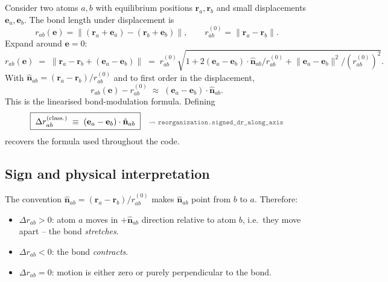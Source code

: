 \documentclass[10pt,a4paper,twoside]{article}
\newcommand{\rvec}{\mathbf{r}}
\newcommand{\evec}{\mathbf{e}}
\newcommand{\nhat}{\hat{\mathbf{n}}}
\newcommand{\codref}[1]{%
  \quad\text{\textcolor{gray!70!black}{\footnotesize $\rightsquigarrow$~\texttt{#1}}}}
\begin{document}
Consider two atoms $a, b$ with equilibrium positions $\rvec_a, \rvec_b$
and small displacements $\evec_a, \evec_b$. The bond length under
displacement is
\begin{equation}
  r_{ab}(\evec) = \lVert (\rvec_a + \evec_a) - (\rvec_b + \evec_b)\rVert,
  \qquad
  r_{ab}^{(0)} = \lVert\rvec_a - \rvec_b\rVert.
\end{equation}
Expand around $\evec = 0$:
\begin{equation}
  r_{ab}(\evec)
    \;=\;
  \lVert \rvec_a - \rvec_b + (\evec_a - \evec_b)\rVert
    \;=\;
  r_{ab}^{(0)}\sqrt{1 + 2(\evec_a - \evec_b)\cdot\nhat_{ab}/r_{ab}^{(0)}
       + \lVert\evec_a - \evec_b\rVert^2/(r_{ab}^{(0)})^2}.
\end{equation}
With $\nhat_{ab} = (\rvec_a - \rvec_b)/r_{ab}^{(0)}$ and to first
order in the displacement,
\begin{equation}
  r_{ab}(\evec) - r_{ab}^{(0)}
    \;\approx\;
  (\evec_a - \evec_b) \cdot \nhat_{ab}.
  \label{eq:dr-firstorder}
\end{equation}
This is the linearised bond-modulation formula. Defining
\begin{equation}
  \boxed{\;\Delta r_{ab}^\text{(class.)}
    \;\equiv\;
   (\evec_a - \evec_b)\cdot\nhat_{ab}\;}
  \codref{reorganization.signed\_dr\_along\_axis}
  \label{eq:dr-classical-final}
\end{equation}
recovers the formula used throughout the code.

\subsection{Sign and physical interpretation}

The convention $\nhat_{ab} = (\rvec_a - \rvec_b)/r_{ab}^{(0)}$ makes
$\nhat_{ab}$ point from $b$ to $a$. Therefore:
\begin{itemize}
  \item $\Delta r_{ab} > 0$: atom $a$ moves in $+\nhat_{ab}$ direction
        relative to atom $b$, i.e.\ they move apart -- the bond
        \emph{stretches}.
  \item $\Delta r_{ab} < 0$: the bond \emph{contracts}.
  \item $\Delta r_{ab} = 0$: motion is either zero or purely
        perpendicular to the bond.
\end{itemize}
\end{document}
